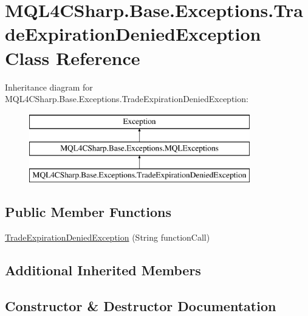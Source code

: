 \hypertarget{class_m_q_l4_c_sharp_1_1_base_1_1_exceptions_1_1_trade_expiration_denied_exception}{}\section{M\+Q\+L4\+C\+Sharp.\+Base.\+Exceptions.\+Trade\+Expiration\+Denied\+Exception Class Reference}
\label{class_m_q_l4_c_sharp_1_1_base_1_1_exceptions_1_1_trade_expiration_denied_exception}
Inheritance diagram for M\+Q\+L4\+C\+Sharp.\+Base.\+Exceptions.\+Trade\+Expiration\+Denied\+Exception\+:\begin{figure}[H]
\begin{center}
\leavevmode
\includegraphics[height=3.000000cm]{class_m_q_l4_c_sharp_1_1_base_1_1_exceptions_1_1_trade_expiration_denied_exception}
\end{center}
\end{figure}
\subsection*{Public Member Functions}
\begin{DoxyCompactItemize}
\item 
\hyperlink{class_m_q_l4_c_sharp_1_1_base_1_1_exceptions_1_1_trade_expiration_denied_exception_a0ffd534eabc7300f8ec6d119b93355df}{Trade\+Expiration\+Denied\+Exception} (String function\+Call)
\end{DoxyCompactItemize}
\subsection*{Additional Inherited Members}


\subsection{Constructor \& Destructor Documentation}
